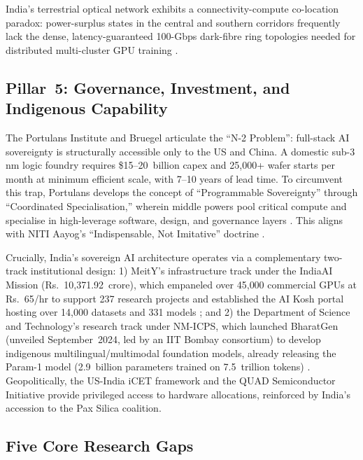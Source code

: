 \documentclass[conference]{IEEEtran}
\begin{document}
India's terrestrial optical network exhibits a connectivity-compute co-location paradox: power-surplus states in the central and southern corridors frequently lack the dense, latency-guaranteed 100-Gbps dark-fibre ring topologies needed for distributed multi-cluster GPU training \cite{trai2026connectivity}.

\subsection{Pillar~5: Governance, Investment, and Indigenous Capability}

The Portulans Institute and Bruegel \cite{portulans2026sovereignty} articulate the ``N-2 Problem'': full-stack AI sovereignty is structurally accessible only to the US and China. A domestic sub-3\,nm logic foundry requires \$15--20~billion capex and 25{,}000+ wafer starts per month at minimum efficient scale, with 7--10 years of lead time. To circumvent this trap, Portulans develops the concept of ``Programmable Sovereignty'' through ``Coordinated Specialisation,'' wherein middle powers pool critical compute and specialise in high-leverage software, design, and governance layers \cite{portulans2026sovereignty}. This aligns with NITI Aayog's ``Indispensable, Not Imitative'' doctrine \cite{niti2026semiconductor}.

Crucially, India's sovereign AI architecture operates via a complementary two-track institutional design: 1) MeitY's infrastructure track under the IndiaAI Mission (Rs.~10{,}371.92~crore), which empaneled over 45{,}000 commercial GPUs at Rs.~65/hr to support 237 research projects and established the AI Kosh portal hosting over 14{,}000 datasets and 331 models \cite{meity2024indiaai,eetimes2026aimission}; and 2) the Department of Science and Technology's research track under NM-ICPS, which launched BharatGen (unveiled September~2024, led by an IIT Bombay consortium) to develop indigenous multilingual/multimodal foundation models, already releasing the Param-1 model (2.9~billion parameters trained on 7.5~trillion tokens) \cite{dst2024bharatgen}. Geopolitically, the US-India iCET framework \cite{whitehouse2023icet} and the QUAD Semiconductor Initiative provide privileged access to hardware allocations, reinforced by India's accession to the Pax Silica coalition.

\subsection{Five Core Research Gaps}
\end{document}

